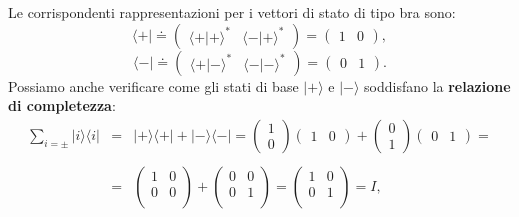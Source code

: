 Le corrispondenti rappresentazioni per i vettori di stato di tipo bra sono:
	\begin{equation}
		\langle + | \doteq
		\begin{pmatrix}
		\langle + | + \rangle ^* & \langle - | + \rangle ^* 
		\end{pmatrix} = 
		\begin{pmatrix}
		1 & 0
		\end{pmatrix} ,
		\end{equation}
		\begin{equation}
		\langle - |  \doteq
		\begin{pmatrix}
		\langle + | - \rangle ^* & \langle - | - \rangle ^* 
		\end{pmatrix} = 
		\begin{pmatrix}
		0 & 1
		\end{pmatrix} .
	\end{equation}
Possiamo anche verificare come gli stati di base $| + \rangle $ e $| - \rangle$ soddisfano la \textbf{relazione di completezza}:
	\begin{eqnarray}
		\sum \limits_{i=\pm} | i \rangle \langle i |  & = & | + \rangle \langle + |  + | - \rangle \langle - |  = 
		\begin{pmatrix}
		1 \\
		0
		\end{pmatrix}
		\begin{pmatrix}
		1 & 0
		\end{pmatrix} + 
		\begin{pmatrix}
		0 \\
		1
		\end{pmatrix}
		\begin{pmatrix}
		0 & 1
		\end{pmatrix}= \nonumber  \\
		\nonumber \\
		& = & \begin{pmatrix}
		1 & 0 \\
		0 & 0 \\
		\end{pmatrix}+
		\begin{pmatrix}
		0 & 0 \\
		0 & 1 \\
		\end{pmatrix}=
		\begin{pmatrix}
		1 & 0 \\
		0 & 1 \\
		\end{pmatrix}=  I  ,
	\end{eqnarray}
